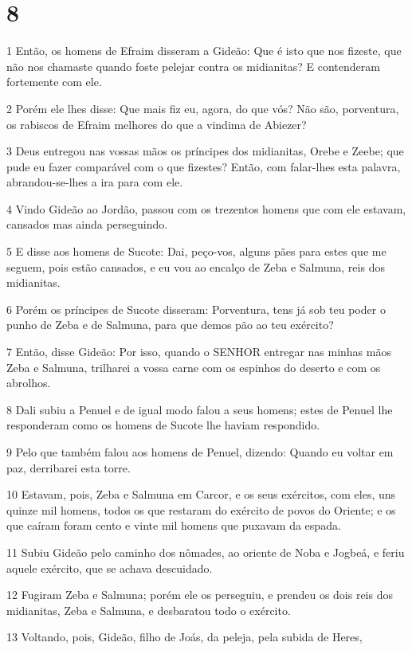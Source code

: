 \chapter{8}

\par 1 Então, os homens de Efraim disseram a Gideão: Que é isto que nos fizeste, que não nos chamaste quando foste pelejar contra os midianitas? E contenderam fortemente com ele.
\par 2 Porém ele lhes disse: Que mais fiz eu, agora, do que vós? Não são, porventura, os rabiscos de Efraim melhores do que a vindima de Abiezer?
\par 3 Deus entregou nas vossas mãos os príncipes dos midianitas, Orebe e Zeebe; que pude eu fazer comparável com o que fizestes? Então, com falar-lhes esta palavra, abrandou-se-lhes a ira para com ele.
\par 4 Vindo Gideão ao Jordão, passou com os trezentos homens que com ele estavam, cansados mas ainda perseguindo.
\par 5 E disse aos homens de Sucote: Dai, peço-vos, alguns pães para estes que me seguem, pois estão cansados, e eu vou ao encalço de Zeba e Salmuna, reis dos midianitas.
\par 6 Porém os príncipes de Sucote disseram: Porventura, tens já sob teu poder o punho de Zeba e de Salmuna, para que demos pão ao teu exército?
\par 7 Então, disse Gideão: Por isso, quando o SENHOR entregar nas minhas mãos Zeba e Salmuna, trilharei a vossa carne com os espinhos do deserto e com os abrolhos.
\par 8 Dali subiu a Penuel e de igual modo falou a seus homens; estes de Penuel lhe responderam como os homens de Sucote lhe haviam respondido.
\par 9 Pelo que também falou aos homens de Penuel, dizendo: Quando eu voltar em paz, derribarei esta torre.
\par 10 Estavam, pois, Zeba e Salmuna em Carcor, e os seus exércitos, com eles, uns quinze mil homens, todos os que restaram do exército de povos do Oriente; e os que caíram foram cento e vinte mil homens que puxavam da espada.
\par 11 Subiu Gideão pelo caminho dos nômades, ao oriente de Noba e Jogbeá, e feriu aquele exército, que se achava descuidado.
\par 12 Fugiram Zeba e Salmuna; porém ele os perseguiu, e prendeu os dois reis dos midianitas, Zeba e Salmuna, e desbaratou todo o exército.
\par 13 Voltando, pois, Gideão, filho de Joás, da peleja, pela subida de Heres,
